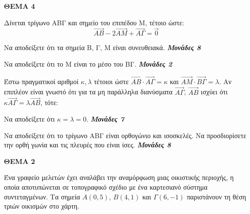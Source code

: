 \documentclass[11pt,a4paper,twoside]{book}
\newcommand{\OnPar}[1]{{\notoserif\bfseries\fontsize{18}{22}\selectfont #1}}
\newcommand{\monades}[1]{
\hspace*{\fill}
\textbf{\textit{\textcolor{maincolor}{Μονάδες #1}}}}
\begin{document}
\vspace{4mm}

\noindent\textbf{ΘΕΜΑ 4}

Δίνεται τρίγωνο ΑΒΓ και σημείο του επιπέδου Μ, τέτοιο ώστε:
\[ \vec{AB} - 2\vec{AM} + \vec{A\Gamma} = \vec{0} \]

\begin{alist}    \item Να αποδείξετε ότι τα σημεία Β, Γ, Μ είναι συνευθειακά. \monades{8}
    \item Να αποδείξετε ότι το Μ είναι το μέσο του ΒΓ. \monades{2}
    \item Έστω πραγματικοί αριθμοί $\kappa, \lambda$ τέτοιοι ώστε $\vec{AB} \cdot \vec{A\Gamma} = \kappa$ και $\vec{AM} \cdot \vec{B\Gamma} = \lambda$.
 Αν επιπλέον είναι γνωστό ότι για τα μη παράλληλα διανύσματα $\vec{A\Gamma}$, $\vec{AB}$ ισχύει ότι $\kappa \vec{A\Gamma} = \lambda \vec{AB}$, τότε:
    \begin{rlist}
        \item Να αποδείξετε ότι $\kappa = \lambda = 0$. \monades{7}
        \item Να αποδείξετε ότι το τρίγωνο ΑΒΓ είναι ορθογώνιο και ισοσκελές. Να προσδιορίσετε την ορθή γωνία και τις πλευρές που είναι ίσες. \monades{8}
    \end{rlist}\end{alist}

\vspace{4mm}

\OnPar{ΘΕΜΑ 2}

Ένα γραφείο μελετών έχει αναλάβει την αναμόρφωση μιας οικιστικής περιοχής, η οποία
αποτυπώνεται σε τοπογραφικό σχέδιο με ένα καρτεσιανό σύστημα συντεταγμένων. Τα
σημεία $A(0,5)$, $B(4,1)$ και $\Gamma(6, -1)$ παριστάνουν τη θέση τριών οικισμών στο χάρτη.

\begin{center}
\end{center}
\end{document}
